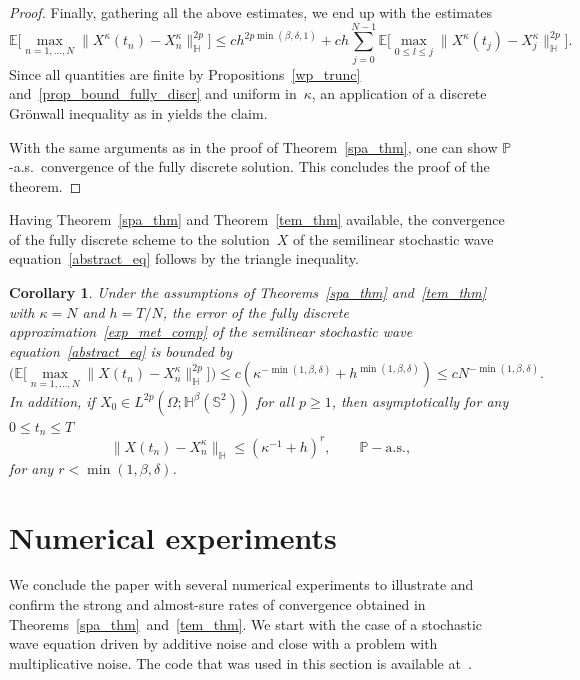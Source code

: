\documentclass[a4paper]{amsart}
\newtheorem{cor}[thm]{Corollary}
\theoremstyle{remark}
\theoremstyle{definition}
\newcommand{\HH}{\mathbb{H}}
\begin{document}
\begin{proof}
Finally, gathering all the above estimates, we end up with the estimates
$$
\mathbb{E}\bigg[\max_{n=1,\dots,N}\big\|X^\kappa(t_n)-X_{n}^\kappa \big\|^{2p}_{\HH}\bigg]
    \le 
        c h^{2p\min(\beta,\delta,1)}
        + c h \sum_{j=0}^{N-1}\mathbb{E}\bigg[\max_{0\le l \le j}\big\|
 X^\kappa(t_j)-X^\kappa_{j}\big\|^{2p}_{\HH}\bigg].
$$
Since all quantities are finite by Propositions~\ref{wp_trunc} and~\ref{prop_bound_fully_discr} and uniform in~$\kappa$, an application of a discrete Gr\"onwall inequality as in \cite[Lemma~A.4]{K14} yields the claim.

With the same arguments as in the proof of Theorem~\ref{spa_thm}, one can show $\mathbb{P}$-a.s.\ convergence of the fully discrete solution. This concludes the proof of the theorem.
\end{proof}

Having Theorem~\ref{spa_thm} and Theorem~\ref{tem_thm} available, the convergence of the fully discrete scheme to the solution~$X$ of the semilinear stochastic wave equation~\eqref{abstract_eq}  follows by the triangle inequality.
\begin{cor}
\label{ful_res}
Under the assumptions of Theorems~\ref{spa_thm} and~\ref{tem_thm} with $\kappa=N$ and $h=T/N$, the error of the fully discrete approximation~\eqref{exp_met_comp} of the semilinear stochastic wave equation~\eqref{abstract_eq} is bounded by
$$
\bigg(\mathbb{E}\bigg[\max_{n=1,\dots,N}\big\|X(t_n)-X^\kappa_{n}\big\|^{2p}_{\HH}\bigg]\bigg)
\le c \left(\kappa^{-\min(1,\beta,\delta)} + h^{\min(1,\beta,\delta)}\right)
\le c N^{-\min(1,\beta,\delta)}.
$$
In addition, if $X_0\in L^{2p}(\Omega; {\HH}^\beta(\mathbb{S}^2))$ for all $p\geq 1$, then asymptotically for any $0\leq t_n\leq T$
\begin{equation*}
\big\|X(t_n)-X^\kappa_n \big\|_{\HH} \le (\kappa^{-1} + h)^{r},  \qquad \mathbb{P}-\text{a.s.},
\end{equation*}
for any $r< \min(1,\beta,\delta)$.
\end{cor}



\section{Numerical experiments}\label{sec-num}

We conclude the paper with several numerical experiments to illustrate and confirm the strong and almost-sure rates of convergence obtained in Theorems~\ref{spa_thm}~and~\ref{tem_thm}. We start with the case of a stochastic wave equation driven by additive noise and close with a problem with multiplicative noise. The code that was used in this section is available at~\cite{CDL26_code}.
\end{document}
